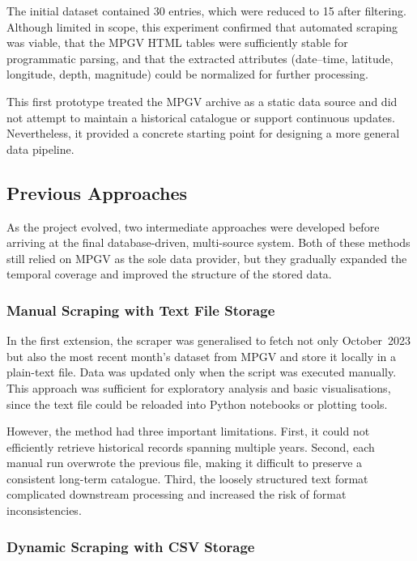\documentclass[12pt]{article}
\begin{document}
The initial dataset contained 30 entries, which were reduced to 15 after filtering. Although limited in scope, this experiment confirmed that automated scraping was viable, that the MPGV HTML tables were sufficiently stable for programmatic parsing, and that the extracted attributes (date--time, latitude, longitude, depth, magnitude) could be normalized for further processing.

This first prototype treated the MPGV archive as a static data source and did not attempt to maintain a historical catalogue or support continuous updates. Nevertheless, it provided a concrete starting point for designing a more general data pipeline.

\vspace{0.4cm}

\subsection{Previous Approaches}

As the project evolved, two intermediate approaches were developed before arriving at the final database-driven, multi-source system. Both of these methods still relied on MPGV as the sole data provider, but they gradually expanded the temporal coverage and improved the structure of the stored data.

\subsubsection*{Manual Scraping with Text File Storage}

In the first extension, the scraper was generalised to fetch not only October~2023 but also the most recent month’s dataset from MPGV and store it locally in a plain-text file. Data was updated only when the script was executed manually. This approach was sufficient for exploratory analysis and basic visualisations, since the text file could be reloaded into Python notebooks or plotting tools.

However, the method had three important limitations. First, it could not efficiently retrieve historical records spanning multiple years. Second, each manual run overwrote the previous file, making it difficult to preserve a consistent long-term catalogue. Third, the loosely structured text format complicated downstream processing and increased the risk of format inconsistencies.

\subsubsection*{Dynamic Scraping with CSV Storage}
\end{document}
